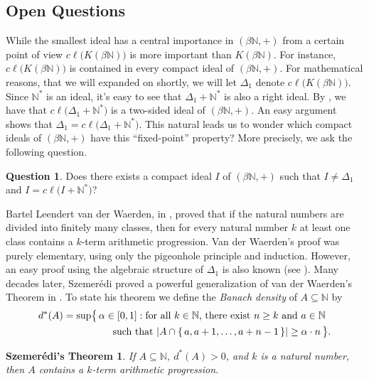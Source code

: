\documentclass[12pt]{article}
\theoremstyle{plain}
\newtheorem{sz}[thm]{Szemer\'{e}di's Theorem}
\theoremstyle{definition}
\newtheorem{ques}[thm]{Question}
\newcommand{\bbN}{\mathbb{N}}
\begin{document}
\subsection{Open Questions}
While the smallest ideal has a central importance in $(\beta\bbN, +)$
from a certain point of view $c\ell\bigl(K(\beta\bbN)\bigr)$ is more
important than $K(\beta\bbN)$. 
For instance, $c\ell\bigl(K(\beta\bbN)\bigr)$ is contained in every
compact ideal of $(\beta\bbN, +)$. 
For mathematical reasons, that we will expanded on shortly, we will
let $\Delta_1$ denote $c\ell\bigl(K(\beta\bbN)\bigr)$. 
Since $\bbN^*$ is an ideal, it's easy to see that $\Delta_1 +
\bbN^*$ is also a right ideal.
By \cite[Theorem 2.19(a)]{Hindman:1998fk}, we have that
$c\ell\bigl(\Delta_1 + \bbN^*\bigr)$ is a two-sided ideal of
$(\beta\bbN, +)$.
An easy argument shows that $\Delta_1 = c\ell\bigl(\Delta_1 +
\bbN^*\bigr)$. 
This natural leads us to wonder which compact ideals of $(\beta\bbN,
+)$ have this ``fixed-point'' property?
More precisely, we ask the following question.
\begin{ques}
  Does there exists a compact ideal $I$ of $(\beta\bbN, +)$ such that
  $I \ne \Delta_1$ and $I = c\ell\bigl(I + \bbN^*)$? 
\end{ques}

Bartel Leendert van der Waerden, in \cite{Van-der-Waerden:1927fk},
proved that if the natural numbers are divided into finitely many
classes, then for every natural number $k$ at least one class contains
a $k$-term arithmetic progression.
Van der Waerden's proof was purely elementary, using only the
pigeonhole principle and induction. 
However, an easy proof using the algebraic structure of $\Delta_1$ is
also known (see \cite[Theorem 14.1 and Corollary 14.2]{Hindman:1998fk}).
Many decades later, Szemer\'{e}di proved a powerful generalization of van
der Waerden's Theorem in \cite{Szemeredi:1975uq}.
To state his theorem we define the \textsl{Banach density} of $A
\subseteq \bbN$ by
\begin{align*}
  d^*(A) &= \sup\bigl\{\, \alpha \in [0,1] : \hbox{for all $k \in
    \bbN$, there exist $n \ge k$ and $a \in \bbN$} \\
  &\hspace{5em}\hbox{such that $|A \cap \{\,a, a+1, \ldots,
    a+n-1\,\}| \ge \alpha\cdot n$} \,\bigr\}.
\end{align*}
\begin{sz}
  If $A \subseteq \bbN$, $d^*(A) > 0$, and $k$ is a natural number,
  then $A$ contains a $k$-term arithmetic progression. 
\end{sz}
\end{document}
